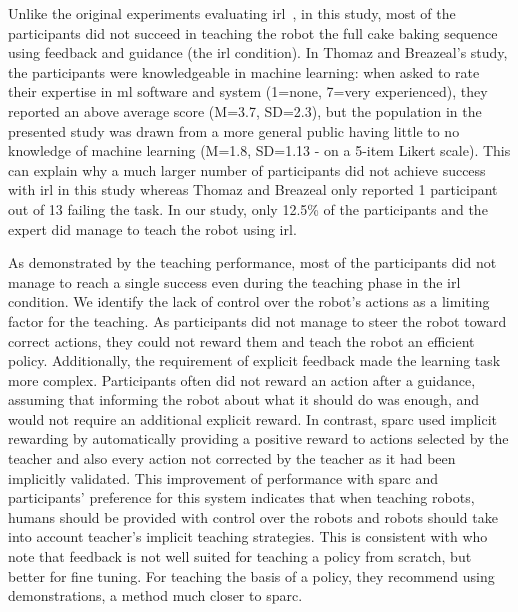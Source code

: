 
Unlike the original experiments evaluating \gls{irl}~\citep{thomaz2008teachable}, in this study, most of the participants did not succeed in teaching the robot the full cake baking sequence using feedback and guidance (the \gls{irl} condition). In Thomaz and Breazeal's study, the participants were knowledgeable in machine learning: when asked to rate their expertise in \gls{ml} software and system (1=none, 7=very experienced), they reported an above average score (M=3.7, SD=2.3), but the population in the presented study was drawn from a more general public having little to no knowledge of machine learning (M=1.8, SD=1.13 - on a 5-item Likert scale). This can explain why a much larger number of participants did not achieve success with \gls{irl} in this study whereas Thomaz and Breazeal only reported 1 participant out of 13 failing the task. In our study, only 12.5\% of the participants and the expert did manage to teach the robot using \gls{irl}. 

As demonstrated by the teaching performance, most of the participants did not manage to reach a single success even during the teaching phase in the \gls{irl} condition. We identify the lack of control over the robot's actions as a limiting factor for the teaching. As participants did not manage to steer the robot toward correct actions, they could not reward them and teach the robot an efficient policy. Additionally, the requirement of explicit feedback made the learning task more complex. Participants often did not reward an action after a guidance, assuming that informing the robot about what it should do was enough, and would not require an additional explicit reward. In contrast, \gls{sparc} used implicit rewarding by automatically providing a positive reward to actions selected by the teacher and also every action not corrected by the teacher as it had been implicitly validated. This improvement of performance with \gls{sparc} and participants' preference for this system indicates that when teaching robots, humans should be provided with control over the robots and robots should take into account teacher's implicit teaching strategies. This is consistent with \cite{kaochar2011towards} who note that feedback is not well suited for teaching a policy from scratch, but better for fine tuning. For teaching the basis of a policy, they recommend using demonstrations, a method much closer to \gls{sparc}. 

